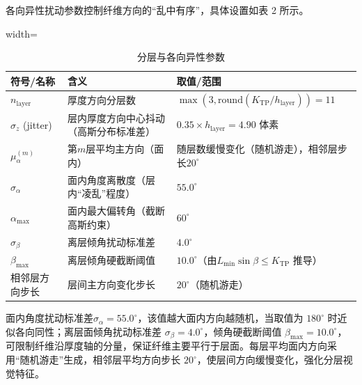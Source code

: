 各向异性扰动参数控制纤维方向的“乱中有序”，具体设置如表 2 所示。
\begin{table}[H]
\centering
\begingroup
\small
\setlength{\tabcolsep}{6pt}
\renewcommand{\arraystretch}{1.15}
\begin{adjustbox}{width=\columnwidth}
\begin{tabular}{p{2.2cm}p{3.0cm}p{3.2cm}}
\toprule
\textbf{符号/名称} & \textbf{含义} & \textbf{取值/范围} \\
\midrule
$n_{\mathrm{layer}}$& 厚度方向分层数 & $\max(3, \text{round}(K_{\text{TP}} / h_{\text{layer}})) = 11$ \\
$\sigma_z$ (jitter) & 层内厚度方向中心抖动（高斯分布标准差） & $0.35 \times h_{\text{layer}} = 4.90$ 体素 \\
$\mu_{\alpha}^{(m)}$ & 第$m$层平均主方向（面内） & 随层数缓慢变化（随机游走），相邻层步长$20^\circ$ \\
$\sigma_{\alpha}$ & 面内角度离散度（层内“凌乱”程度） & $55.0^\circ$ \\
$\alpha_{\text{max}}$ & 面内最大偏转角（截断高斯约束） & $60^\circ$ \\
$\sigma_{\beta}$ & 离层倾角扰动标准差 & $4.0^\circ$ \\
$\beta_{\text{max}}$ & 离层倾角硬截断阈值 & $10.0^\circ$（由$L_{\text{min}} \sin\beta \leq K_{\text{TP}}$ 推导） \\
相邻层方向步长 & 层间主方向变化步长 & $20^\circ$（随机游走） \\
\bottomrule
\end{tabular}
\end{adjustbox}
\caption{分层与各向异性参数}
\label{tab:anisotropic_params}
\endgroup
\end{table}

{\raggedright
\hspace{2em}面内角度扰动标准差\(\sigma_{\alpha}=55.0^\circ\)，该值越大面内方向越随机，当取值为 \(180^\circ\) 时近似各向同性；离层面倾角扰动标准差 \(\sigma_{\beta}=4.0^\circ\)，倾角硬截断阈值 \(\beta_{\text{max}}=10.0^\circ\)，可限制纤维沿厚度轴的分量，保证纤维主要平行于层面。每层平均面内方向采用“随机游走”生成，相邻层平均方向步长 \(20^\circ\)，使层间方向缓慢变化，强化分层视觉特征。
\par}


